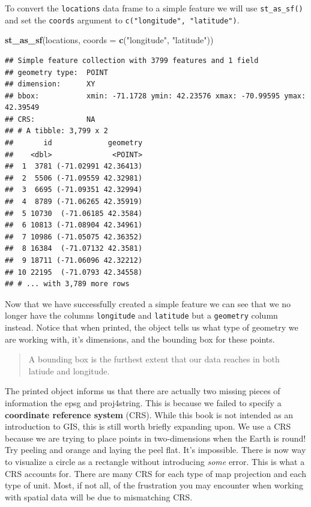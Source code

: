 \documentclass[
]{book}
\newenvironment{Shaded}{\begin{snugshade}}{\end{snugshade}}
\newcommand{\DataTypeTok}[1]{\textcolor[rgb]{0.13,0.29,0.53}{#1}}
\newcommand{\KeywordTok}[1]{\textcolor[rgb]{0.13,0.29,0.53}{\textbf{#1}}}
\newcommand{\NormalTok}[1]{#1}
\newcommand{\StringTok}[1]{\textcolor[rgb]{0.31,0.60,0.02}{#1}}
\begin{document}
To convert the \texttt{locations} data frame to a simple feature we will use \texttt{st\_as\_sf()} and set the \texttt{coords} argument to \texttt{c("longitude",\ "latitude")}.

\begin{Shaded}
\begin{Highlighting}[]
\KeywordTok{st\_as\_sf}\NormalTok{(locations,}
         \DataTypeTok{coords =} \KeywordTok{c}\NormalTok{(}\StringTok{"longitude"}\NormalTok{, }\StringTok{"latitude"}\NormalTok{))}
\end{Highlighting}
\end{Shaded}

\begin{verbatim}
## Simple feature collection with 3799 features and 1 field
## geometry type:  POINT
## dimension:      XY
## bbox:           xmin: -71.1728 ymin: 42.23576 xmax: -70.99595 ymax: 42.39549
## CRS:            NA
## # A tibble: 3,799 x 2
##       id             geometry
##    <dbl>              <POINT>
##  1  3781 (-71.02991 42.36413)
##  2  5506 (-71.09559 42.32981)
##  3  6695 (-71.09351 42.32994)
##  4  8789 (-71.06265 42.35919)
##  5 10730  (-71.06185 42.3584)
##  6 10813 (-71.08904 42.34961)
##  7 10986 (-71.05075 42.36352)
##  8 16384  (-71.07132 42.3581)
##  9 18711 (-71.06096 42.32212)
## 10 22195  (-71.0793 42.34558)
## # ... with 3,789 more rows
\end{verbatim}

Now that we have successfully created a simple feature we can see that we no longer have the columns \texttt{longitude} and \texttt{latitude} but a \texttt{geometry} column instead. Notice that when printed, the object tells us what type of geometry we are working with, it's dimensions, and the bounding box for these points.

\begin{quote}
A bounding box is the furthest extent that our data reaches in both latiude and longitude.
\end{quote}

The printed object informs us that there are actually two missing pieces of information the epsg and proj4string. This is because we failed to specify a \textbf{coordinate reference system} (CRS). While this book is not intended as an introduction to GIS, this is still worth briefly expanding upon. We use a CRS because we are trying to place points in two-dimensions when the Earth is round! Try peeling and orange and laying the peel flat. It's impossible. There is now way to visualize a circle as a rectangle without introducing \emph{some} error. This is what a CRS accounts for. There are many CRS for each type of map projection and each type of unit. Most, if not all, of the frustration you may encounter when working with spatial data will be due to mismatching CRS.
\end{document}
